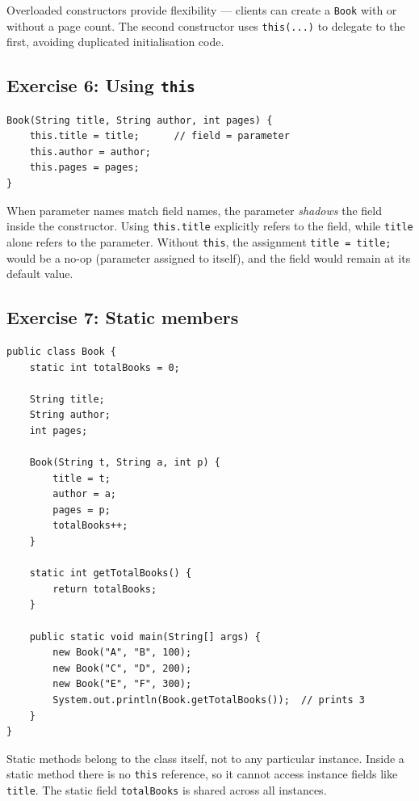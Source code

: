 \documentclass[twoside=false,DIV=14]{scrartcl}
\begin{document}
Overloaded constructors provide flexibility --- clients can create a \texttt{Book} with or without a page count.  The second constructor uses \texttt{this(...)} to delegate to the first, avoiding duplicated initialisation code.

\subsection*{Exercise 6: Using \texttt{this}}

\begin{lstlisting}
Book(String title, String author, int pages) {
    this.title = title;      // field = parameter
    this.author = author;
    this.pages = pages;
}
\end{lstlisting}

When parameter names match field names, the parameter \emph{shadows} the field inside the constructor.  Using \texttt{this.title} explicitly refers to the field, while \texttt{title} alone refers to the parameter.  Without \texttt{this}, the assignment \texttt{title = title;} would be a no-op (parameter assigned to itself), and the field would remain at its default value.

\subsection*{Exercise 7: Static members}

\begin{lstlisting}
public class Book {
    static int totalBooks = 0;

    String title;
    String author;
    int pages;

    Book(String t, String a, int p) {
        title = t;
        author = a;
        pages = p;
        totalBooks++;
    }

    static int getTotalBooks() {
        return totalBooks;
    }

    public static void main(String[] args) {
        new Book("A", "B", 100);
        new Book("C", "D", 200);
        new Book("E", "F", 300);
        System.out.println(Book.getTotalBooks());  // prints 3
    }
}
\end{lstlisting}

Static methods belong to the class itself, not to any particular instance.  Inside a static method there is no \texttt{this} reference, so it cannot access instance fields like \texttt{title}.  The static field \texttt{totalBooks} is shared across all instances.
\end{document}
